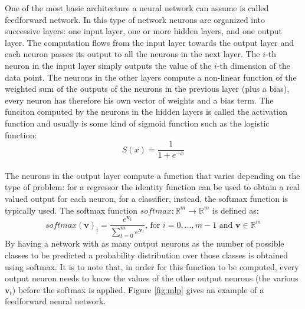 \documentclass[12pt]{article}
\newcommand{\vect}[1]{\boldsymbol{#1}}
\begin{document}
One of the most basic architecture a neural network can assume is called feedforward network. In this type of network neurons are organized into successive layers: one input layer, one or more hidden layers, and one output layer. The computation flows from the input layer towards the output layer and each neuron passes its output to all the neurons in the next layer. The $i$-th neuron in the input layer simply outputs the value of the $i$-th dimension of the data point. The neurons in the other layers compute a non-linear function of the weighted sum of the outputs of the neurons in the previous layer (plus a bias), every neuron has therefore his own vector of weights and a bias term. The funciton computed by the neurons in the hidden layers is called the activation function and usually is some kind of sigmoid function such as the logistic function:
\begin{equation}
\label{eq:sigmoid}
S(x) = \frac{1}{1 + e^{-x}}
\end{equation}\\
The neurons in the output layer compute a function that varies depending on the type of problem: for a regressor the identity function can be used to obtain a real valued output for each neuron, for a classifier, instead, the softmax function is typically used. The softmax function $ softmax: \mathbb{R}^m \rightarrow \mathbb{R}^m $ is defined as:
\begin{equation}
\label{eq:softmax}
softmax(\vect{v})_i = \frac{e^{\vect{v}_i}}{\sum_{t=0}^{m}e^{\vect{v}_t}} \text{, for } i = 0,\ldots,m-1 \text{ and } \vect{v} \in \mathbb{R}^m
\end{equation}
By having a network with as many output neurons as the number of possible classes to be predicted a probability distribution over those classes is obtained using softmax. It is to note that, in order for this function to be computed, every output neuron needs to know the values of the other output neurons (the various $ \vect{v}_t$) before the softmax is applied. Figure \ref{fig:mlp} gives an example of a feedforward neural network.
\end{document}
